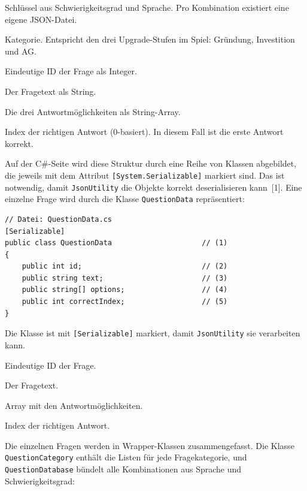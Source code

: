 \documentclass[12pt,a4paper]{article}
\begin{document}
\begin{description}[leftmargin=2em, labelwidth=1.5em]
    \item[(1)] Schlüssel aus Schwierigkeitsgrad und Sprache. Pro Kombination existiert eine eigene JSON-Datei.
    \item[(2)] Kategorie. Entspricht den drei Upgrade-Stufen im Spiel: Gründung, Investition und AG.
    \item[(3)] Eindeutige ID der Frage als Integer.
    \item[(4)] Der Fragetext als String.
    \item[(5)] Die drei Antwortmöglichkeiten als String-Array.
    \item[(6)] Index der richtigen Antwort (0-basiert). In diesem Fall ist die erste Antwort korrekt.
\end{description}

Auf der C\#-Seite wird diese Struktur durch eine Reihe von Klassen abgebildet, die jeweils mit dem Attribut \texttt{[System.Serializable]} markiert sind. Das ist notwendig, damit \texttt{JsonUtility} die Objekte korrekt deserialisieren kann~[1]. Eine einzelne Frage wird durch die Klasse \texttt{QuestionData} repräsentiert:

\begin{lstlisting}
// Datei: QuestionData.cs
[Serializable]
public class QuestionData                     // (1)
{
    public int id;                            // (2)
    public string text;                       // (3)
    public string[] options;                  // (4)
    public int correctIndex;                  // (5)
}
\end{lstlisting}

\begin{description}[leftmargin=2em, labelwidth=1.5em]
    \item[(1)] Die Klasse ist mit \texttt{[Serializable]} markiert, damit \texttt{JsonUtility} sie verarbeiten kann.
    \item[(2)] Eindeutige ID der Frage.
    \item[(3)] Der Fragetext.
    \item[(4)] Array mit den Antwortmöglichkeiten.
    \item[(5)] Index der richtigen Antwort.
\end{description}

Die einzelnen Fragen werden in Wrapper-Klassen zusammengefasst. Die Klasse \texttt{QuestionCategory} enthält die Listen für jede Fragekategorie, und \texttt{QuestionDatabase} bündelt alle Kombinationen aus Sprache und Schwierigkeitsgrad:
\end{document}
